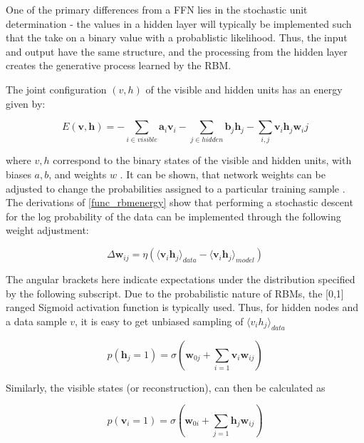 \documentclass[a4paper,11pt,oneside]{article}
\theoremstyle{plain}
\theoremstyle{definition}
\begin{document}
One of the primary differences from a FFN lies in the stochastic unit determination - the values in a hidden layer will typically be implemented such that the take on a binary value with a probablistic likelihood. Thus, the input and output have the same structure, and the processing from the hidden layer creates the generative process learned by the RBM. \newline

The joint configuration $(v,h)$ of the visible and hidden units has an energy given by:

\begin{equation}\label{func_rbmenergy}
E(\mathbf{v},\mathbf{h}) = - \sum_{i \in visible} \mathbf{a}_i\mathbf{v}_i - \sum_{j \in hidden} \mathbf{b}_j\mathbf{h}_j - \sum_{i,j}\mathbf{v}_i\mathbf{h}_j\mathbf{w}_ij
\end{equation}

where $v,h$ correspond to the binary states of the visible and hidden units, with biases $a,b$, and weights $w$ \cite{Hinton5}. It can be shown, that network weights can be adjusted to change the probabilities assigned to a particular training sample \cite{Hinton5}. The derivations of \ref{func_rbmenergy} show that performing a stochastic descent for the log probability of the data can be implemented through the following weight adjustment:

\begin{equation}
\Delta \mathbf{w}_{ij} = \eta (\langle \mathbf{v}_i\mathbf{h}_j\rangle_{data} - \langle \mathbf{v}_i\mathbf{h}_j\rangle_{model})
\end{equation}

The angular brackets here indicate expectations under the distribution specified by the following subscript. Due to the probabilistic nature of RBMs, the [0,1] ranged Sigmoid activation function is typically used. Thus, for hidden nodes and a data sample $v$, it is easy to get unbiased sampling of $\langle v_ih_j \rangle_{data}$

\begin{equation}
p(\mathbf{h}_j=1) = \sigma(\mathbf{w}_{0j} +  \sum_{i=1}\mathbf{v}_i\mathbf{w}_{ij})
\end{equation}

Similarly, the visible states (or reconstruction), can then be calculated as 

\begin{equation}
p(\mathbf{v}_i=1) = \sigma(\mathbf{w}_{0i} + \sum_{j=1}\mathbf{h}_j\mathbf{w}_{ij})
\end{equation}
\end{document}
